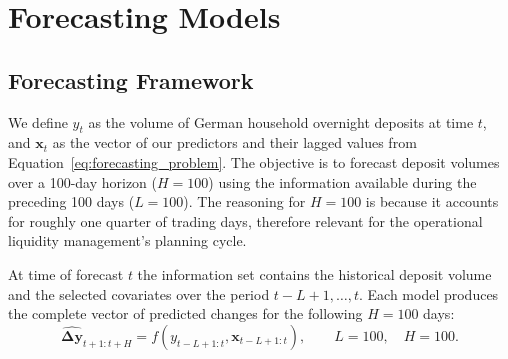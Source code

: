\documentclass[11pt,a4paper]{article}
\begin{document}
\section{Forecasting Models}
\label{sec:models}
\subsection{Forecasting Framework}
\label{sec:framework}

We define \(y_t\) as the volume of German household overnight deposits at time
\(t\), and \(\mathbf{x}_t\) as the vector of our predictors and their lagged values from Equation~\eqref{eq:forecasting_problem}. The objective is to forecast deposit volumes over a
100-day horizon ($H=100$) using the information available during the preceding 100
days ($L=100$). The reasoning for $H=100$ is because it accounts for roughly one quarter of trading days, therefore relevant for the operational liquidity management's planning cycle. 

At time of forecast \(t\) the information set contains the historical deposit volume and the
selected covariates over the period \(t-L+1,\ldots,t\). Each model produces
the complete vector of predicted changes for the following \(H=100\) days:
\begin{equation}
    \widehat{\boldsymbol{\Delta y}}_{t+1:t+H}
    =
    f\!\left(
        y_{t-L+1:t},
        \mathbf{x}_{t-L+1:t}
    \right),
    \qquad L=100,\quad H=100.
    \label{eq:forecasting_problem}
\end{equation}

\end{document}
